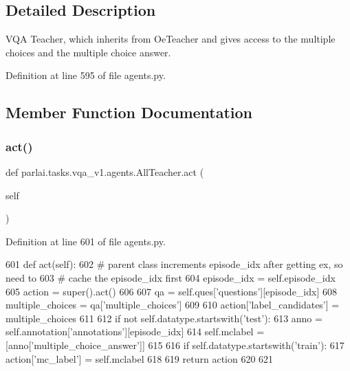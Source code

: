 \subsection{Detailed Description}
\begin{DoxyVerb}VQA Teacher, which inherits from OeTeacher and gives access to the multiple choices
and the multiple choice answer.
\end{DoxyVerb}
 

Definition at line 595 of file agents.\+py.



\subsection{Member Function Documentation}
\mbox{\label{classparlai_1_1tasks_1_1vqa__v1_1_1agents_1_1AllTeacher_af1d9fbd6919aba788a5c76f3fbe59957}} 
\subsubsection{\texorpdfstring{act()}{act()}}
{\footnotesize\ttfamily def parlai.\+tasks.\+vqa\+\_\+v1.\+agents.\+All\+Teacher.\+act (\begin{DoxyParamCaption}\item[{}]{self }\end{DoxyParamCaption})}



Definition at line 601 of file agents.\+py.


\begin{DoxyCode}
601     \textcolor{keyword}{def }act(self):
602         \textcolor{comment}{# parent class increments episode\_idx after getting ex, so need to}
603         \textcolor{comment}{# cache the episode\_idx first}
604         episode\_idx = self.episode\_idx
605         action = super().act()
606 
607         qa = self.ques[\textcolor{stringliteral}{'questions'}][episode\_idx]
608         multiple\_choices = qa[\textcolor{stringliteral}{'multiple\_choices'}]
609 
610         action[\textcolor{stringliteral}{'label\_candidates'}] = multiple\_choices
611 
612         \textcolor{keywordflow}{if} \textcolor{keywordflow}{not} self.datatype.startswith(\textcolor{stringliteral}{'test'}):
613             anno = self.annotation[\textcolor{stringliteral}{'annotations'}][episode\_idx]
614             self.mclabel = [anno[\textcolor{stringliteral}{'multiple\_choice\_answer'}]]
615 
616         \textcolor{keywordflow}{if} self.datatype.startswith(\textcolor{stringliteral}{'train'}):
617             action[\textcolor{stringliteral}{'mc\_label'}] = self.mclabel
618 
619         \textcolor{keywordflow}{return} action
620 
621 
\end{DoxyCode}


